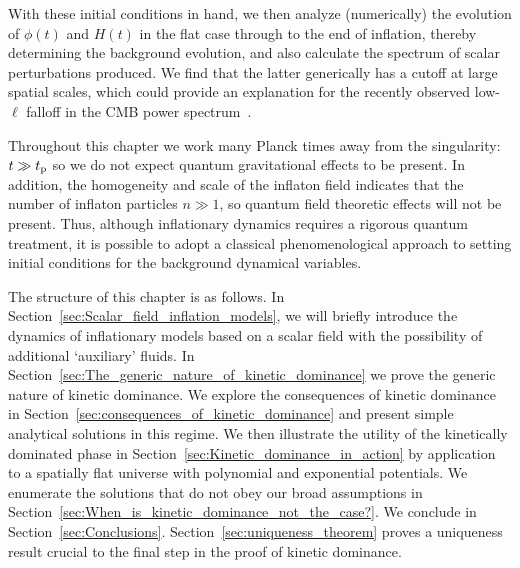 With these initial conditions in hand, we then analyze (numerically) the evolution of \(\phi(t)\) and \(H(t)\) in the flat case through to the end of inflation, thereby determining the background evolution, and also calculate the spectrum of scalar perturbations produced. We find that the latter generically has a cutoff at large spatial scales, which could provide an explanation for the recently observed low-\(\ell\) falloff in the CMB power spectrum~\citep{hinshaw_nine-year_2012,planck_collaboration_planck_2013}.
 
Throughout this chapter we work many Planck times away from the singularity: \(t\gg t_{\mathrm{p}}\) so we do not expect quantum gravitational effects to be present.  In addition, the homogeneity and scale of the inflaton field indicates that the number of inflaton particles \(n\gg1\), so quantum field theoretic effects will not be present.  Thus, although inflationary dynamics requires a rigorous quantum treatment, it is possible to adopt a classical phenomenological approach to setting initial conditions for the background dynamical variables.  

The structure of this chapter is as follows.  In Section~\ref{sec:Scalar_field_inflation_models}, we will briefly introduce the dynamics of inflationary models based on a scalar field with the possibility of additional `auxiliary' fluids.  In Section~\ref{sec:The_generic_nature_of_kinetic_dominance} we prove the generic nature of kinetic dominance.  We explore the consequences of kinetic dominance in Section~\ref{sec:consequences_of_kinetic_dominance} and present simple analytical solutions in this regime.  We then illustrate the utility of the kinetically dominated phase in Section~\ref{sec:Kinetic_dominance_in_action} by application to a spatially flat universe with polynomial and exponential potentials.  We enumerate the solutions that do not obey our broad assumptions in Section~\ref{sec:When_is_kinetic_dominance_not_the_case?}.  We conclude in Section~\ref{sec:Conclusions}. Section~\ref{sec:uniqueness_theorem} proves a uniqueness result crucial to the final step in the proof of kinetic dominance.  

